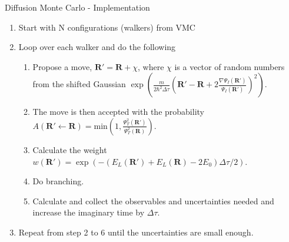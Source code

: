 \documentclass{beamer}
\newcommand{\R}{\mathbf{R}}
\begin{document}
\begin{frame}{Diffusion Monte Carlo - Implementation}
\begin{enumerate}
   \item Start with N configurations (walkers) from VMC
   \item Loop over each walker and do the following
   \begin{enumerate}
      \setlength\itemsep{0.2em}
      \item Propose a move, $\R' = \R + \chi$, where $\chi$ is a vector of random numbers from the shifted Gaussian $\exp\left(\frac{m}{2\hbar^2\Delta\tau}\left(\R'-\R+2\frac{\nabla\Psi_I(\R')}{\Psi_I(\R')}\right)^2\right)$.
      \item The move is then accepted with the probability $A(\R'\leftarrow\R)=\mathrm{min}\left(1,\frac{\Psi_T^2(\R')}{\Psi_T^2(\R)}\right)$.
      \item Calculate the weight $w(\R')=\exp\left(-\left(E_L(\R')+E_L(\R)-2E_0\right)\Delta\tau/2\right)$.
      \item Do branching.
      \item Calculate and collect the observables and uncertainties needed and increase the imaginary time by $\Delta\tau$.
   \end{enumerate}
   \item Repeat from step 2 to 6 until the uncertainties are small enough.
\end{enumerate}
\end{frame}
\fi
\end{document}

